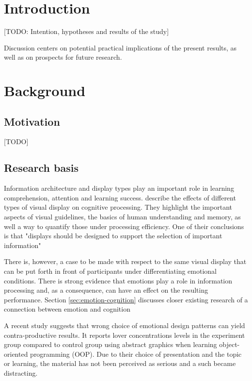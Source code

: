\clearpage

\section{Introduction}

[TODO: Intention, hypotheses and results of the study]



Discussion centers on potential practical implications of the present results, as well as on prospects for future research.

\clearpage

\section{Background}

	\subsection{Motivation}
	
	[TODO]
	
	
	
		
	\subsection{Research basis} \label{sec:research}
	
	Information architecture and display types play an important role in learning comprehension, attention and learning success. \cite{McCrudden2017} describe the effects of different types of visual display on cognitive processing. They highlight the important aspects of visual guidelines, the basics of human understanding and  memory, as well a way to quantify those under processing efficiency. One of their conclusions is that "displays should be designed to support the selection of important information" \cite[p.633]{McCrudden2017}
	
	There is, however, a case to be made with respect to the same visual display that can be put forth in front of participants under differentiating emotional conditions. There is strong evidence that emotions play a role in information processing and, as a consequence, can have an effect on the resulting performance. Section \ref{sec:emotion-cognition} discusses closer existing research of a connection between emotion and cognition
	
	A recent study \cite{Haaranen2015} suggests that wrong choice of emotional design patterns can yield contra-productive results. It reports lover concentrations levels in the experiment group compared to control group using abstract graphics when learning object-oriented programming (OOP). Due to their choice of presentation and the topic or learning, the material has not been perceived as serious and a such became distracting.
		
